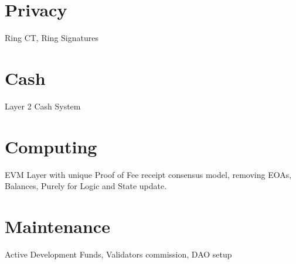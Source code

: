 \documentclass[a4paper,11pt]{article}
\begin{document}
\section{Privacy}
Ring CT, Ring Signatures

\section{Cash}
Layer 2 Cash System

\section{Computing}
EVM Layer with unique Proof of Fee receipt consensus model, removing EOAs, Balances, Purely for Logic and State update.

\section{Maintenance}
Active Development Funds, Validators commission, DAO setup

\end{document}
